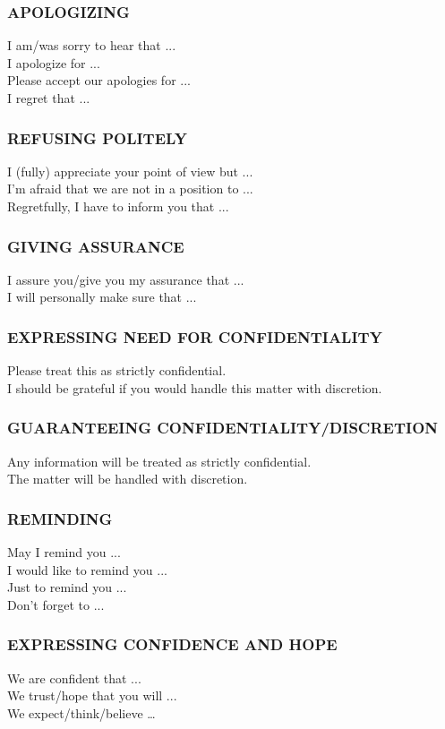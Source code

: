 \subsubsection{APOLOGIZING}
I am/was sorry to hear that ...\\
I apologize for ...\\
Please accept our apologies for ...\\
I regret that ... \\
\subsubsection{REFUSING POLITELY}
I (fully) appreciate your point of view but ...\\
I’m afraid that we are not in a position to ...\\
Regretfully, I have to inform you that ...\\
\subsubsection{GIVING ASSURANCE}
I assure you/give you my assurance that ...\\
I will personally make sure that ...\\
\subsubsection{EXPRESSING NEED FOR CONFIDENTIALITY}
Please treat this as strictly confidential.\\
I should be grateful if you would handle this matter with discretion.\\
\subsubsection{GUARANTEEING CONFIDENTIALITY/DISCRETION}
Any information will be treated as strictly confidential.\\
The matter will be handled with discretion.\\
\subsubsection{REMINDING}
May I remind you ...\\
I would like to remind you ...\\
Just to remind you ...\\
Don't forget to ...\\
\subsubsection{EXPRESSING CONFIDENCE AND HOPE}
We are confident that ...\\
We trust/hope that you will ...\\
We expect/think/believe …\\
